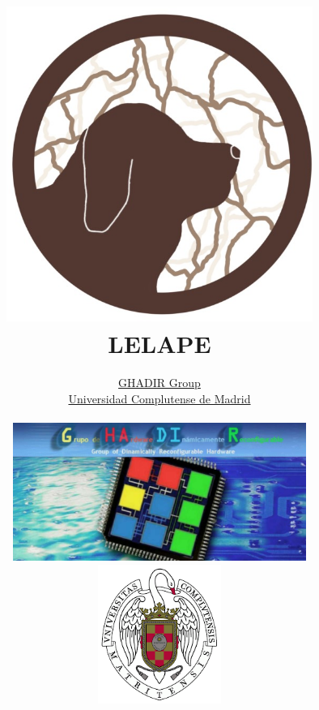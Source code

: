 \documentclass[a4paper,11pt]{book}
\begin{document}
\title{\includegraphics[width=10cm]{fig/LELAPE_LOGO.png}\\ \Huge{\textbf{LELAPE}}}
\author{\href{https://www.ucm.es/ghadir}{GHADIR Group} \\ \href{https://www.ucm.es}{Universidad Complutense de Madrid} \\ \vspace{1cm}\\  \includegraphics[height=4.5cm]{fig/Ghadir_group.jpg}\hspace{1cm} \includegraphics[width=4cm]{fig/logo_ucm.png}}
\date{}



\frontmatter
\maketitle
\tableofcontents

\mainmatter





\backmatter


\end{document}
